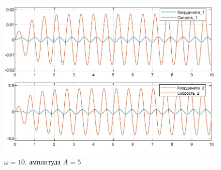 \documentclass{article}
\begin{document}
	\begin{figure}[H]
		\centering
		\includegraphics[width=0.7\linewidth]{ssine}
		\caption{$\omega = 10$, амплитуда $A = 5$}
		\label{fig:ssine}
	\end{figure}
\end{document}
